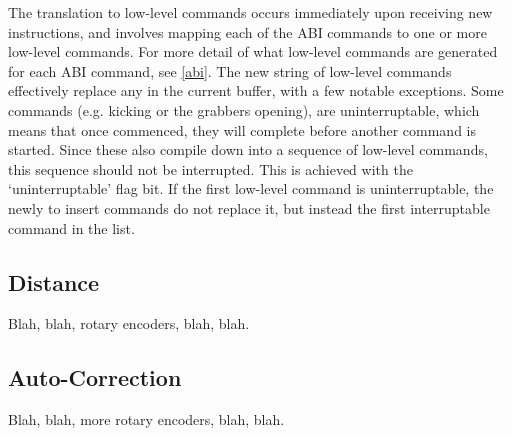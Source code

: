The translation to low-level commands occurs immediately upon receiving new
instructions, and involves mapping each of the ABI commands to one or more
low-level commands. For more detail of what low-level commands are generated
for each ABI command, see \cref{abi}. The new string of low-level commands
effectively replace any in the current buffer, with a few notable exceptions.
Some commands (e.g. kicking or the grabbers opening), are uninterruptable,
which means that once commenced, they will complete before another command is
started. Since these also compile down into a sequence of low-level commands,
this sequence should not be interrupted. This is achieved with the
`uninterruptable' flag bit. If the first low-level command is uninterruptable,
the newly to insert commands do not replace it, but instead the first
interruptable command in the list.

\subsection{Distance}

Blah, blah, rotary encoders, blah, blah.

\subsection{Auto-Correction}

Blah, blah, more rotary encoders, blah, blah.
